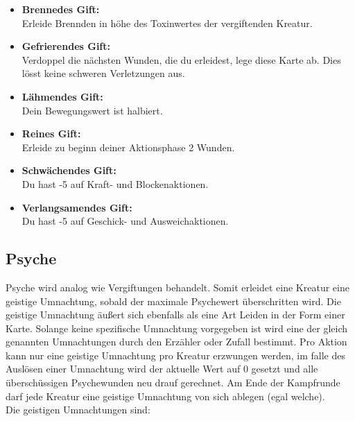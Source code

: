 \begin{itemize}
    \item \textbf{Brennedes Gift:}\\
    Erleide Brennden in höhe des Toxinwertes der vergiftenden Kreatur.
    \item \textbf{Gefrierendes Gift:}\\
    Verdoppel die nächsten Wunden, die du erleidest, lege diese Karte ab. Dies lösst keine schweren Verletzungen aus.
    \item \textbf{Lähmendes Gift:}\\
    Dein Bewegungswert ist halbiert.
    \item \textbf{Reines Gift:}\\
    Erleide zu beginn deiner Aktionsphase 2 Wunden.
    \item \textbf{Schwächendes Gift:}\\
    Du hast -5 auf Kraft- und Blockenaktionen.
    \item \textbf{Verlangsamendes Gift:}\\
    Du hast -5 auf Geschick- und Ausweichaktionen.
\end{itemize}


\subsection*{Psyche}
Psyche wird analog wie Vergiftungen behandelt. Somit erleidet eine Kreatur eine geistige Umnachtung, sobald der maximale Psychewert überschritten wird.
Die geistige Umnachtung äußert sich ebenfalls als eine Art Leiden in der Form einer Karte. Solange keine spezifische Umnachtung vorgegeben ist wird eine der gleich genannten Umnachtungen durch den Erzähler oder Zufall bestimmt.
Pro Aktion kann nur eine geistige Umnachtung pro Kreatur erzwungen werden, im falle des Auslösen einer Umnachtung wird der aktuelle Wert auf 0 gesetzt und alle überschüssigen Psychewunden neu drauf gerechnet.
Am Ende der Kampfrunde darf jede Kreatur eine geistige Umnachtung von sich ablegen (egal welche).\\
Die geistigen Umnachtungen sind:

